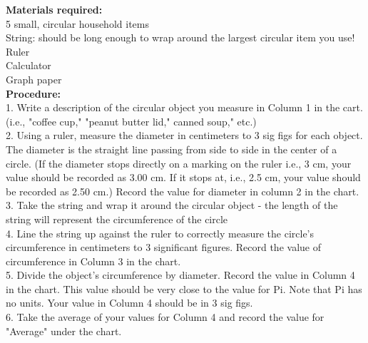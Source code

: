 \documentclass[12pt]{article}
\begin{document}
    \textbf{Materials required:}
    \\ \hspace{4mm} 5 small, circular household items
    \\ \hspace{4mm}String: should be long enough to wrap around the largest circular item you use!
    \\ \hspace{4mm} Ruler
    \\ \hspace{4mm} Calculator
    \\ \hspace{4mm} Graph paper \\



    \textbf{Procedure:}
    \\ 1. \hspace{2mm} Write a description of the circular object you measure in Column 1 in the cart. (i.e., "coffee cup," "peanut butter lid," canned soup," etc.)
    \\ 2. \hspace{2mm} Using a ruler, measure the diameter in centimeters to 3 sig figs for each object. The diameter is the straight line passing from side to side in the center of a circle. (If the diameter stops directly on a marking on the ruler i.e., 3 cm, your value should be recorded as 3.00 cm. If it stops at, i.e., 2.5 cm, your value should be recorded as 2.50 cm.) Record the value for diameter in column 2 in the chart.  
    \\ 3. \hspace{2mm} Take the string and wrap it around the circular object - the length of the string will represent the circumference of the circle
    \\ 4. \hspace{2mm} Line the string up against the ruler to correctly measure the circle's circumference in centimeters to 3 significant figures. Record the value of circumference in Column 3 in the chart.
    \\ 5. \hspace{2mm} Divide the object's circumference by diameter. Record the value in Column 4 in the chart. This value should be very close to the value for Pi. Note that Pi has no units. Your value in Column 4 should be in 3 sig figs.
    \\ 6. \hspace{2mm} Take the average of your values for Column 4 and record the value for "Average" under the chart. \\
\end{document}

